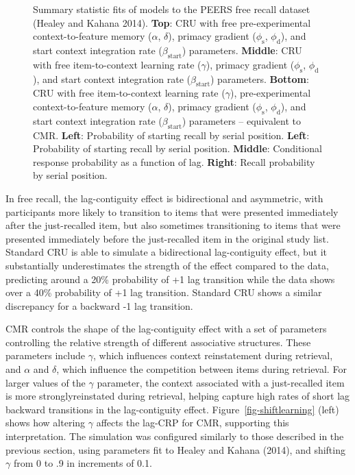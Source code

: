 \documentclass[
  letterpaper,
  11pt,
  english,
  singlespacing,
  headsepline]{MastersDoctoralThesis}
\begin{document}
\begin{figure}
\caption{\label{fig-fitlagcrp}Summary statistic fits of models to the
PEERS free recall dataset (Healey and Kahana 2014). \textbf{Top}: CRU
with free pre-experimental context-to-feature memory (\(\alpha\),
\(\delta\)), primacy gradient (\(\phi_\text{s}\), \(\phi_\text{d}\)),
and start context integration rate (\(\beta_\text{start}\)) parameters.
\textbf{Middle}: CRU with free item-to-context learning rate
(\(\gamma\)), primacy gradient (\(\phi_\text{s}\), \(\phi_\text{d}\)),
and start context integration rate (\(\beta_\text{start}\)) parameters.
\textbf{Bottom}: CRU with free item-to-context learning rate
(\(\gamma\)), pre-experimental context-to-feature memory (\(\alpha\),
\(\delta\)), primacy gradient (\(\phi_\text{s}\), \(\phi_\text{d}\)),
and start context integration rate (\(\beta_\text{start}\)) parameters
-- equivalent to CMR. \textbf{Left}: Probability of starting recall by
serial position. \textbf{Left}: Probability of starting recall by serial
position. \textbf{Middle}: Conditional response probability as a
function of lag. \textbf{Right}: Recall probability by serial position.}

\end{figure}%

In free recall, the lag-contiguity effect is bidirectional and
asymmetric, with participants more likely to transition to items that
were presented immediately after the just-recalled item, but also
sometimes transitioning to items that were presented immediately before
the just-recalled item in the original study list. Standard CRU is able
to simulate a bidirectional lag-contiguity effect, but it substantially
underestimates the strength of the effect compared to the data,
predicting around a 20\% probability of +1 lag transition while the data
shows over a 40\% probability of +1 lag transition. Standard CRU shows a
similar discrepancy for a backward -1 lag transition.

CMR controls the shape of the lag-contiguity effect with a set of
parameters controlling the relative strength of different associative
structures. These parameters include \(\gamma\), which influences
context reinstatement during retrieval, and \(\alpha\) and \(\delta\),
which influence the competition between items during retrieval. For
larger values of the \(\gamma\) parameter, the context associated with a
just-recalled item is more stronglyreinstated during retrieval, helping
capture high rates of short lag backward transitions in the
lag-contiguity effect. Figure~\ref{fig-shiftlearning} (left) shows how
altering \(\gamma\) affects the lag-CRP for CMR, supporting this
interpretation. The simulation was configured similarly to those
described in the previous section, using parameters fit to Healey and
Kahana (2014), and shifting \(\gamma\) from 0 to .9 in increments of
0.1.
\end{document}
